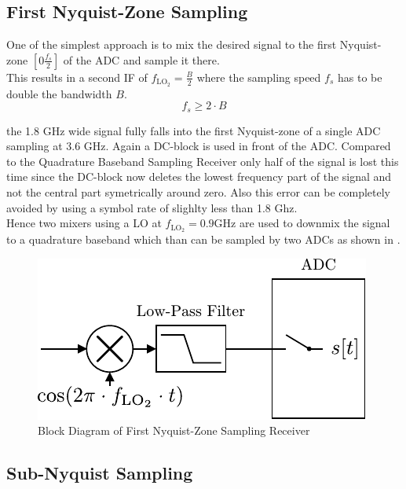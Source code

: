 \subsection{First Nyquist-Zone Sampling}
\label{sec:rx_adc_0}
One of the simplest approach is to mix the desired signal to the first
Nyquist-zone $[0 \frac{f_s}{2}]$ of the \gls{ADC} and sample it there. \\

This results in a second \gls{IF} of $f_{\text{LO}_2} = \frac{B}{2}$ where
the sampling speed $f_s$ has to be double the bandwidth $B$.
\[f_s \geq 2 \cdot B\]

the 1.8 GHz wide signal fully falls into the first Nyquist-zone of
a single \gls{ADC} sampling at 3.6 GHz. Again a \gls{DC}-block
is used in front of the \gls{ADC}. Compared to the Quadrature Baseband
Sampling Receiver only half of the signal is lost this time since
the \gls{DC}-block now deletes the lowest frequency part of the signal
and not the central part symetrically around zero. Also this error
can be completely avoided by using a symbol rate of slighlty less
than 1.8 Ghz. \\


Hence two mixers using a \gls{LO} at $f_{\text{LO}_2} = 0.9 \text{GHz}$ are
used to downmix the signal to a quadrature baseband which than can
be sampled by two \glspl{ADC} as shown in . \\

\begin{figure}[ht]
  \centering
  \includegraphics[width=\textwidth]{figures/rx_adc_0_bd}
  \caption{Block Diagram of First Nyquist-Zone Sampling Receiver}
  \label{fig:rx_adc_0_bd}
\end{figure}

\subsection{Sub-Nyquist Sampling}
\label{sec:rx_adc_2}

